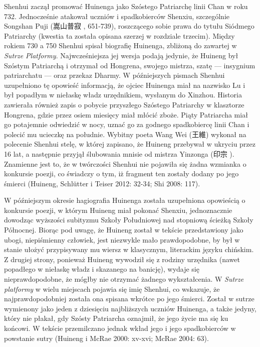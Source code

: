 Shenhui zaczął promować Huinenga jako Szóstego Patriarchę linii Chan w roku 732.
Jednocześnie atakował uczniów i spadkobierców Shenxiu, szczególnie Songshan Puji (嵩山普寂 , 651-739), roszczącego sobie prawa do tytułu Siódmego Patriarchy (kwestia ta została opisana szerzej w rozdziale trzecim).
Między rokiem 730 a 750 Shenhui spisał biografię Huinenga, zbliżoną do zawartej w \textit{Sutrze Platformy}.
Najwcześniejsza jej wersja podają jedynie, że Huineng był Szóstym Patriarchą i otrzymał od Hongrena, swojego mistrza, szatę --- insygnium patriarchatu --- oraz przekaz Dharmy.
W późniejszych pismach Shenhui uzupełniono tę opowieść informacją, że ojciec Huinenga miał na nazwisko Lu i był popadłym w niełaskę władz urzędnikiem, wysłanym do Xinzhou.
Historia zawierała również zapis o pobycie przyszłego Szóstego Patriarchy w klasztorze Hongrena, gdzie przez osiem miesięcy miał młócić zboże.
Piąty Patriarcha miał go potajemnie odwiedzić w nocy, uznać go za godnego spadkobiercę linii Chan i polecić mu ucieczkę na południe.
Wybitny poeta Wang Wei (王維) wykonał na polecenie Shenhui stelę, w której zapisano, że Huineng przebywał w ukryciu przez 16 lat, a następnie przyjął ślubowania mnisie od mistrza Yinzonga (印宗 ).
Znamienne jest to, że w twórczości Shenhui nie pojawiła się żadna wzmianka o konkursie poezji, co świadczy o tym, iż fragment ten zostały dodany po jego śmierci
(Huineng, Schlütter i Teiser 2012: 32-34; Shi 2008: 117).

W późniejszym okresie hagiografia Huinenga została uzupełniona opowieścią o konkursie poezji, w którym Huineng miał pokonać Shenxiu, jednoznacznie dowodząc wyższości subityzmu Szkoły Południowej nad stopniową ścieżką Szkoły Północnej.
Biorąc pod uwagę, że Huineng został w tekście przedstawiony jako ubogi, niepiśmienny człowiek, jest niezwykle mało prawdopodobne, by był w stanie ułożyć przypisywany mu wiersz w klasycznym, literackim języku chińskim.
Z drugiej strony, ponieważ Huineng wywodził się z rodziny urzędnika (nawet popadłego w niełaskę władz i skazanego na banicję), wydaje się nieprawdopodobne, że mógłby nie otrzymać żadnego wykształcenia.
W \textit{Sutrze platformy} w wielu miejscach pojawia się imię Shenhui, co wskazuje, że najprawdopodobniej została ona spisana wkrótce po jego śmierci.
Został w sutrze wymienony jako jeden z dziesięciu najbliższych uczniów Huinenga, a także jedyny, który nie płakał, gdy Szósty Patriarcha oznajmił, że jego życie ma się ku końcowi.
W tekście przemilczano jednak wkład jego i jego spadkobierców w powstanie sutry
(Huineng i McRae 2000: xv-xvi; McRae 2004: 63).

